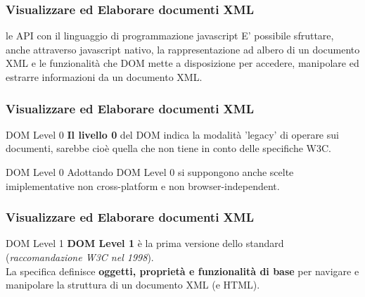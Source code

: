 \begin{frame}
    \frametitle{Visualizzare ed Elaborare documenti XML}
    \addtocounter{nframe}{1}
    

     \begin{block}{le API con il linguaggio di programmazione javascript}
       E' possibile sfruttare, anche attraverso javascript nativo, la rappresentazione ad albero di un documento XML e le funzionalità che DOM mette a disposizione per accedere, manipolare ed estrarre informazioni da un documento XML.
     \end{block}
     
\end{frame}


\begin{frame}
    \frametitle{Visualizzare ed Elaborare documenti XML}
    \addtocounter{nframe}{1}
    

     \begin{block}{DOM Level 0}
       \textbf{Il livello 0} del DOM indica la modalità 'legacy' di operare sui documenti, sarebbe cioè quella che non tiene in conto delle specifiche W3C.
     \end{block}
     

     \begin{block}{DOM Level 0}
        Adottando DOM Level 0 si suppongono anche scelte imiplementative non cross-platform e non browser-independent.
      \end{block}

\end{frame}

\begin{frame}
    \frametitle{Visualizzare ed Elaborare documenti XML}
    \addtocounter{nframe}{1}
    

     \begin{block}{DOM Level 1}
       \textbf{DOM Level 1} è la prima versione dello standard (\textit{raccomandazione W3C nel 1998}). 
       \\ La specifica definisce  \textbf{oggetti, proprietà e funzionalità di base} per navigare e manipolare la struttura di un documento XML (e HTML).
     \end{block}

\end{frame}



